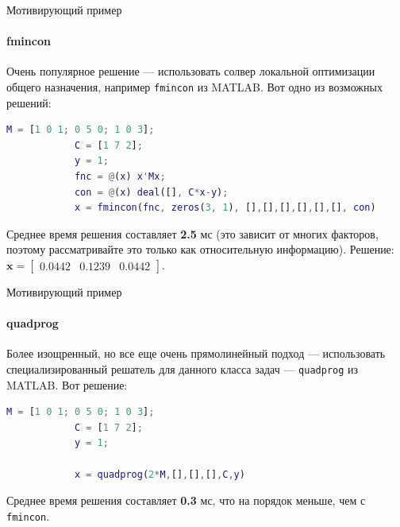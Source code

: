 \documentclass{beamer}
\begin{document}
\begin{frame}[fragile]{Мотивирующий пример}
	\framesubtitle{fmincon}
	\begin{flushleft}
		
		Очень популярное решение — использовать солвер локальной оптимизации общего назначения, например \texttt{fmincon} из MATLAB. Вот одно из возможных решений:
		
		\begin{lstlisting}[language=Matlab]
			M = [1 0 1; 0 5 0; 1 0 3];
			C = [1 7 2];
			y = 1;
			fnc = @(x) x'Mx;
			con = @(x) deal([], C*x-y);
			x = fmincon(fnc, zeros(3, 1), [],[],[],[],[],[], con)
		\end{lstlisting}
		Среднее время решения составляет \textbf{2.5} мс (это зависит от многих факторов, поэтому рассматривайте это только как относительную информацию).
		Решение: $\mathbf{x} = \begin{bmatrix} 0.0442 & 0.1239 & 0.0442 \end{bmatrix}$.
		
	\end{flushleft}
\end{frame}


\begin{frame}[fragile]{Мотивирующий пример}
	\framesubtitle{quadprog}
	\begin{flushleft}
		
		Более изощренный, но все еще очень прямолинейный подход — использовать специализированный решатель для данного класса задач — \texttt{quadprog} из MATLAB. Вот решение:
		
		\begin{lstlisting}[language=Matlab]
			M = [1 0 1; 0 5 0; 1 0 3];
			C = [1 7 2];
			y = 1;
			
			x = quadprog(2*M,[],[],[],C,y)
		\end{lstlisting}
		
		Среднее время решения составляет \textbf{0.3} мс, что на порядок меньше, чем с \texttt{fmincon}.
		
	\end{flushleft}
\end{frame}
\end{document}
